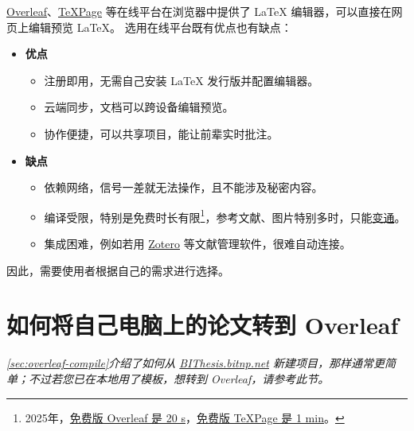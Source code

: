 \href{https://cn.overleaf.com}{Overleaf}、\href{https://www.texpage.com/zh/}{TeXPage} 等在线平台在浏览器中提供了 \LaTeX{} 编辑器，可以直接在网页上编辑预览 \LaTeX{}。
选用在线平台既有优点也有缺点：
\begin{itemize}[noitemsep]
  \item \textbf{优点}
    \begin{itemize}[noitemsep]
      \item ​​注册即用，无需自己安装 \LaTeX{} 发行版并配置编辑器。
      \item 云端同步，文档可以跨设备编辑预览。
      \item 协作便捷，可以共享项目，能让前辈实时批注。
    \end{itemize}
  \item \textbf{缺点}
    \begin{itemize}[noitemsep]
      \item 依赖网络，信号一差就无法操作，且不能涉及秘密内容。
      \item 编译受限，特别是免费时长有限\footnote{2025年，\href{https://cn.overleaf.com/user/subscription/choose-your-plan}{免费版 Overleaf 是 20 s}，\href{https://www.texpage.com/}{免费版 TeXPage 是 1 min}。}，参考文献、图片特别多时，只能\href{https://bithesis.bitnp.net/faq/slow.html}{变通}。
      \item 集成困难，例如若用 \href{https://www.zotero.org}{Zotero} 等文献管理软件，很难自动连接。
    \end{itemize}
\end{itemize}

因此，需要使用者根据自己的需求进行选择。

\section{如何将自己电脑上的论文转到 Overleaf}

\textit{
\autoref{sec:overleaf-compile}介绍了如何从 \href{https://bithesis.bitnp.net}{BIThesis.bitnp.net} 新建项目，那样通常更简单；不过若您已在本地用了模板，想转到 Overleaf，请参考此节。
}

